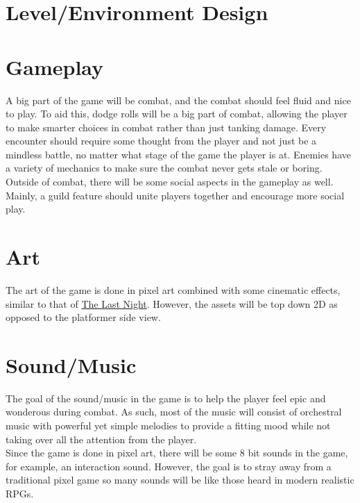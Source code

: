 \documentclass{article}
\begin{document}
\section{Level/Environment Design}

\section{Gameplay}
\hspace*{1cm}
A big part of the game will be combat, and the combat should feel fluid and nice to play. To aid this, dodge rolls will be a big part of combat, allowing the player to make smarter choices in combat rather than just tanking damage. Every encounter should require some thought from the player and not just be a mindless battle, no matter what stage of the game the player is at. Enemies have a variety of mechanics to make sure the combat never gets stale or boring. \\
\hspace*{1cm}
Outside of combat, there will be some social aspects in the gameplay as well. Mainly, a guild feature should unite players together and encourage more social play.

\section{Art}
\hspace*{1cm}
The art of the game is done in pixel art combined with some cinematic effects, similar to that of \href{http://store.steampowered.com/app/612400/The_Last_Night/}{The Last Night}. However, the assets will be top down 2D as opposed to the platformer side view.

\section{Sound/Music}
\hspace*{1cm}
The goal of the sound/music in the game is to help the player feel epic and wonderous during combat. As such, most of the music will consist of orchestral music with powerful yet simple melodies to provide a fitting mood while not taking over all the attention from the player.   \\
\hspace*{1cm}
Since the game is done in pixel art, there will be some 8 bit sounds in the game, for example, an interaction sound. However, the goal is to stray away from a traditional pixel game so many sounds will be like those heard in modern realistic RPGs.
\end{document}
